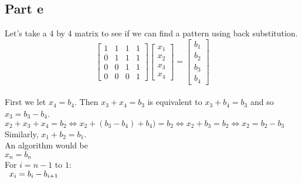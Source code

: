 \documentclass[12pt]{article}
\begin{document}
\subsection*{Part e}
Let's take a 4 by 4 matrix to see if we can find a pattern using back substitution.
\begin{equation}
\begin{bmatrix}
1 & 1 & 1 & 1 \\
0 & 1 & 1 & 1 \\
0 & 0 & 1 & 1 \\
0 & 0 & 0 & 1
\end{bmatrix}
\begin{bmatrix}
x_1 \\
x_2 \\
x_3 \\
x_4
\end{bmatrix}
=
\begin{bmatrix}
b_1 \\
b_2 \\
b_3 \\
b_4
\end{bmatrix}
\end{equation}\\
First we let $x_4=b_4$. Then $x_3 + x_4 = b_3$ is equivalent to $x_3 + b_4 = b_3$ and so $x_3 = b_3 - b_4$. \\
$x_2 + x_3 + x_4 = b_2 \iff x_2 + (b_3-b_4) + b_4) = b_2 \iff x_2 + b_3 = b_2 \iff x_2 = b_2 - b_3$ \\
Similarly, $x_1 + b_2 = b_1$. \\

An algorithm would be \\
$x_n = b_n$ \\
For $i=n-1$ to $1$: \\
$\hspace{5px} x_i = b_i - b_{i+1}$
\end{document}
